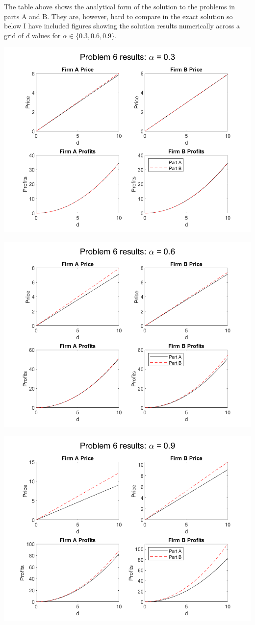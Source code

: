 \documentclass[11pt]{article} %
\begin{document}
The table above shows the analytical form of the solution to the problems in parts A and B. They are, however, hard to compare in the exact solution so below I have included figures showing the solution results numerically across a grid of $d$ values for $\alpha \in \{ 0.3,0.6,0.9\}$.

\includegraphics{fig1}

\includegraphics{fig2}

\includegraphics{fig3}
\end{document}
